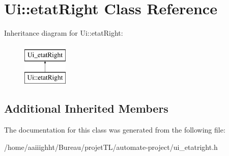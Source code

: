 \hypertarget{class_ui_1_1etat_right}{\section{Ui\-:\-:etat\-Right Class Reference}
\label{class_ui_1_1etat_right}
}
Inheritance diagram for Ui\-:\-:etat\-Right\-:\begin{figure}[H]
\begin{center}
\leavevmode
\includegraphics[height=2.000000cm]{class_ui_1_1etat_right}
\end{center}
\end{figure}
\subsection*{Additional Inherited Members}


The documentation for this class was generated from the following file\-:\begin{DoxyCompactItemize}
\item 
/home/aaiiighht/\-Bureau/projet\-T\-L/automate-\/project/ui\-\_\-etatright.\-h\end{DoxyCompactItemize}

